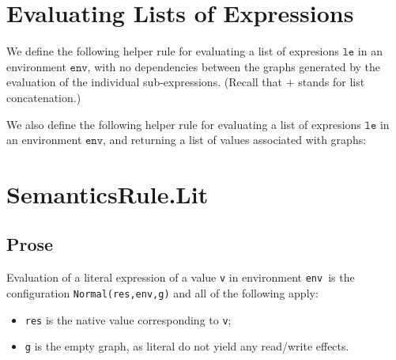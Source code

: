 \documentclass{book}
\newcommand\evalarrow[0]{\rightsquigarrow}
\newcommand\sslash[0]{\mathbin{/\mkern-6mu/}}
\newcommand\terminateas[0]{\;\sslash\;}
\newcommand\ExprThrowsConfig[0]{\texttt{\#T}}
\newcommand\ErrorConfig[0]{\texttt{\#E}}
\newcommand\OrAbnormal[0]{\terminateas \ExprThrowsConfig, \ErrorConfig}
\newcommand\evalexpr[1]{\texttt{eval\_expr}(#1)}
\newcommand\evalexprlist[1]{\texttt{eval\_expr\_list}(#1)}
\newcommand\evalexprlistm[1]{\texttt{eval\_expr\_list\_m}(#1)}
\newcommand\Normal[0]{\textsf{Normal}}
\newcommand\newenv[0]{\texttt{new\_env}}
\newcommand\env[0]{\texttt{env}}
\newcommand\envp[0]{\texttt{env'}}
\newcommand\ve[0]{\texttt{e}}
\newcommand\vg[0]{\texttt{g}}
\newcommand\vm[0]{\texttt{m}}
\newcommand\vv[0]{\texttt{v}}
\newcommand\vvs[0]{\texttt{vs}}
\newcommand\vms[0]{\texttt{ms}}
\newcommand\vle[0]{\texttt{le}}
\newcommand\vvone[0]{\texttt{v1}}
\newcommand\vgone[0]{\texttt{g1}}
\newcommand\vgtwo[0]{\texttt{g2}}
\begin{document}
\section{Evaluating Lists of Expressions}

We define the following helper rule for evaluating a list of expresions $\vle$ in an environment $\env$,
with no dependencies between the graphs generated by the evaluation of the individual sub-expressions.
(Recall that $+$ stands for list concatenation.)

We also define the following helper rule for evaluating a list of expresions $\vle$ in an environment $\env$,
and returning a list of values associated with graphs:

\section{SemanticsRule.Lit \label{sec:SemanticsRule.Lit}}

  \subsection{Prose}
  Evaluation of a literal expression of a value \texttt{v}
  in environment \env\ is the configuration
  \texttt{\Normal(res,env,g)} and all of the following apply:
  \begin{itemize}
  \item \texttt{res} is the native value corresponding to \texttt{v};
  \item \texttt{g} is the empty graph, as literal do not yield any read/write effects.
  \end{itemize}
\end{document}
